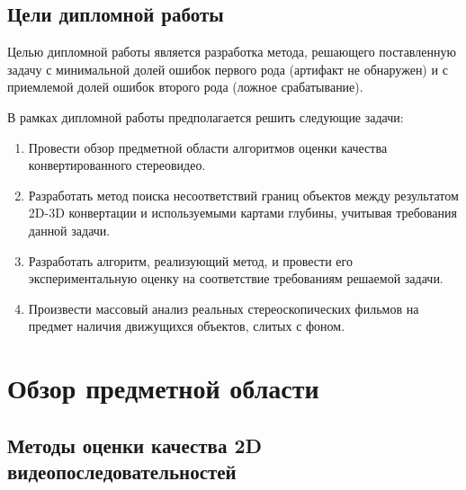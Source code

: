 \documentclass[14pt, a4paper]{extarticle}
\begin{document}
\subsection{Цели дипломной работы}

Целью дипломной работы является разработка метода, решающего поставленную задачу 
с минимальной долей ошибок первого рода (артифакт не обнаружен) и 
с приемлемой долей ошибок второго рода (ложное срабатывание).

В рамках дипломной работы предполагается решить следующие задачи:

\begin{enumerate}
	\item Провести обзор предметной области алгоритмов оценки качества конвертированного стереовидео.
	\item Разработать метод поиска несоответствий границ объектов между результатом 2D-3D конвертации 
	и используемыми картами глубины, учитывая требования данной задачи.
	\item Разработать алгоритм, реализующий метод, и провести его экспериментальную оценку на соответствие требованиям решаемой задачи.
	\item Произвести массовый анализ реальных стереоскопических фильмов на предмет наличия движущихся объектов, слитых с фоном.
\end{enumerate}


\newpage
\section{Обзор предметной области}

\subsection{Методы оценки качества 2D видеопоследовательностей}
\end{document}

